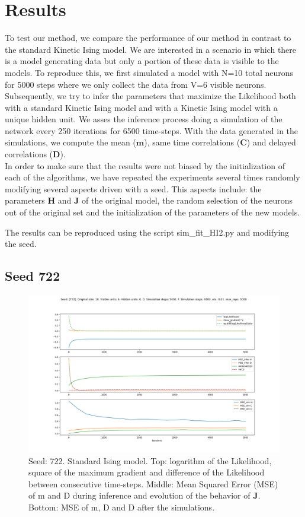 \documentclass{article}
\def\*#1{\mathbf{#1}}
\begin{document}
\section{Results}


To test our method, we compare the performance of our method in contrast to the standard Kinetic Ising model. We are interested in a scenario in which there is a model generating data but only a portion of these data is visible to the models. To reproduce this, we first simulated a model with N=10 total neurons for 5000 steps where we only collect the data from V=6 visible neurons. Subsequently, we try to infer the parameters that maximize the Likelihood both with a standard Kinetic Ising model and with a Kinetic Ising model with a unique hidden unit. We asses the inference process doing a simulation of the network every 250 iterations for 6500 time-steps. With the data generated in the simulations, we compute the mean ($\*m$), same time correlations ($\*C$) and delayed correlations ($\*D$).\\

In order to make sure that the results were not biased by the initialization of each of the algorithms, we have repeated the experiments several times randomly modifying several aspects driven with a seed. This aspects include: the parameters $\*H$ and $\*J$ of the original model, the random selection of the neurons out of the original set and the initialization of the parameters of the new models.

The results can be reproduced using the script sim\_fit\_HI2.py and modifying the seed. 

\newpage
\subsection{Seed 722}

\begin{figure}[!htb]
    \centering
    \includegraphics[width=0.7\linewidth]{images/sqrt_size/[722]_10_6_0_5000_6500_eta001_5000_100.png}
\caption{Seed: 722. Standard Ising model. Top: logarithm of the Likelihood, square of the maximum gradient and difference of the Likelihood between consecutive time-steps. Middle: Mean Squared Error (MSE) of m and D during inference and evolution of the behavior of $\*J$. Bottom: MSE of m, D and D after the simulations.}
\end{figure}
\end{document}
